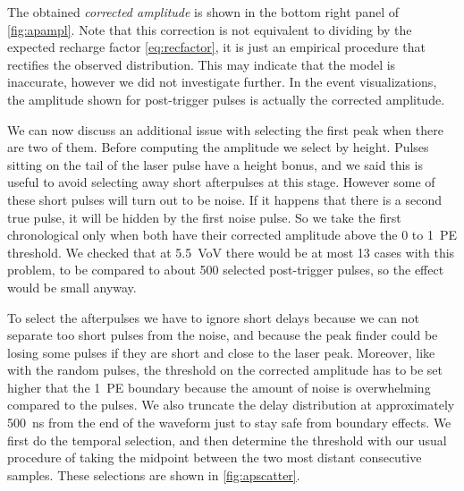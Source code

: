 The obtained \emph{corrected amplitude} is shown in the bottom right panel of
\autoref{fig:apampl}. Note that this correction is not equivalent to dividing
by the expected recharge factor \eqref{eq:recfactor}, it is just an empirical
procedure that rectifies the observed distribution. This may indicate that the
model is inaccurate, however we did not investigate further. In the event
visualizations, the amplitude shown for post-trigger pulses is actually the
corrected amplitude.

We can now discuss an additional issue with selecting the first peak when there
are two of them. Before computing the amplitude we select by height. Pulses
sitting on the tail of the laser pulse have a height bonus, and we said this is
useful to avoid selecting away short afterpulses at this stage. However some of
these short pulses will turn out to be noise. If it happens that there is a
second true pulse, it will be hidden by the first noise pulse. So we take the
first chronological only when both have their corrected amplitude above the 0
to 1~PE threshold. We checked that at \SI{5.5}{VoV} there would be at most 13
cases with this problem, to be compared to about 500 selected post-trigger
pulses, so the effect would be small anyway.

To select the afterpulses we have to ignore short delays because we can not
separate too short pulses from the noise, and because the peak finder could be
losing some pulses if they are short and close to the laser peak. Moreover,
like with the random pulses, the threshold on the corrected amplitude has to be
set higher that the 1~PE boundary because the amount of noise is overwhelming
compared to the pulses. We also truncate the delay distribution at
approximately \SI{500}{ns} from the end of the waveform just to stay safe from
boundary effects. We first do the temporal selection, and then determine the
threshold with our usual procedure of taking the midpoint between the two most
distant consecutive samples. These selections are shown in
\autoref{fig:apscatter}.

\begin{figure}
    

    
\end{figure}

